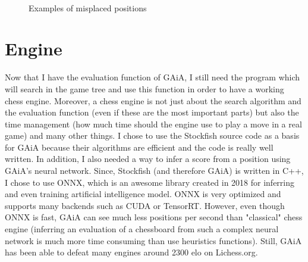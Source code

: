 \documentclass[unnumsec,webpdf,contemporary,large]{Article}%
\theoremstyle{thmstyleone}%
\theoremstyle{thmstyletwo}%
\theoremstyle{thmstylethree}%
\begin{document}
\begin{figure}[H]
  \captionsetup[subfigure]{labelformat=empty}
  \centering
  \\
  \caption{Examples of misplaced positions}
  \label{fig:misplaced}
\end{figure}

\section{Engine}
Now that I have the evaluation function of GAiA,
I still need the program which will search in the game
tree and use this function in order to have a working chess engine.
Moreover, a chess engine is not just about the search algorithm
and the evaluation function (even if these are the most important parts)
but also the time management (how much time should the engine use
to play a move in a real game) and many other things.
I chose to use the Stockfish source code as a basis for GAiA because
their algorithms are efficient and the code is really well written.
In addition, I also needed a way to infer a score from a position
using GAiA's neural network. Since, Stockfish (and therefore GAiA)
is written in C++, I chose to use ONNX\cite{onnx}, which is
an awesome library created in 2018 for inferring and even training
artificial intelligence model. ONNX is very optimized and supports
many backends such as CUDA or TensorRT.
However, even though ONNX is fast, GAiA can see much less positions
per second than "classical" chess engine (inferring an evaluation of a chessboard
from such a complex neural network is much more time consuming than
use heuristics functions).
Still, GAiA has been able to defeat many engines
around 2300 elo on Lichess.org.
\end{document}
